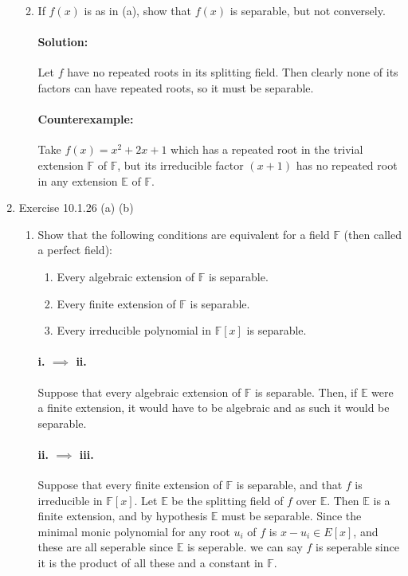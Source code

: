 \documentclass{article}
\begin{document}
\begin{enumerate}
\begin{enumerate}
\begin{enumerate}
            \end{enumerate}   
            \item If $f (x)$ is as in (a), show that $f (x)$ is separable, but not conversely.

              \paragraph{Solution:} Let $f$ have no repeated roots in its splitting field. Then clearly
              none of its factors can have repeated roots, so it must be separable.

              \paragraph{Counterexample:}  Take $f(x)=x^2+2x+1$ which has a repeated root in the trivial extension
              $\mathbb{F}$ of $\mathbb{F}$, but its irreducible factor $(x+1)$ has no repeated root in any
              extension $\mathbb{E}$ of $\mathbb{F}$. 
    \end{enumerate}
\item Exercise 10.1.26 (a) (b)
    \begin{enumerate}
        \item Show that the following conditions are equivalent for a field $\mathbb{F}$ 
            (then called a perfect field):
        \begin{enumerate}
            \item Every algebraic extension of $\mathbb{F}$ is separable.
            \item Every finite extension of $\mathbb{F}$ is separable.
            \item Every irreducible polynomial in $\mathbb{F}[x]$ is separable.
        \end{enumerate}

          \paragraph{i. $\implies$ ii. } Suppose that every algebraic extension of $\mathbb{F}$ 
          is separable. Then, if $\mathbb{E}$ were a finite extension, it would have to be
          algebraic and as such it would be separable.

          \paragraph{ii. $\implies$ iii. } Suppose that every finite extension of $\mathbb{F}$ is separable, and
          that $f$ is irreducible in $\mathbb{F}[x]$. Let $\mathbb{E}$ be the splitting field of $f$ over
          $\mathbb{E}$. Then $\mathbb{E}$ is a finite extension, and by hypothesis 
          $\mathbb{E}$ must be separable. Since the minimal monic polynomial for  any root  $u_i$ of $f$ 
          is $x-u_i\in E[x]$, and these are all seperable since $\mathbb{E}$ is seperable. we can say
          $f$ is seperable since it is the product of all these and a constant in $\mathbb{F}$. 


\end{enumerate}
\end{enumerate}
\end{document}
